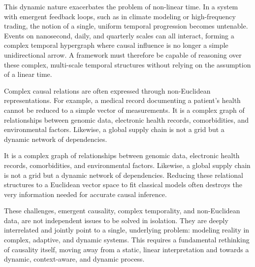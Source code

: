 This dynamic nature exacerbates the problem of non-linear time. In a system with emergent feedback loops, 
such as in climate modeling or high-frequency trading, the notion of a single, uniform temporal progression becomes untenable. 
Events on nanosecond, daily, and quarterly scales can all interact, forming a complex temporal hypergraph where causal influence is no longer a simple unidirectional arrow. 
A framework must therefore be capable of reasoning over these complex, multi-scale temporal structures without relying on the assumption of a linear time. 

Complex causal relations are often expressed through non-Euclidean representations. 
For example, a medical record documenting a patient's health cannot be reduced to a simple vector of measurements. 
It is a complex graph of relationships between genomic data, electronic health records, comorbidities, and environmental factors. 
Likewise, a global supply chain is not a grid but a dynamic network of dependencies.  

It is a complex graph of relationships between genomic data, electronic health records, comorbidities, and environmental factors. 
Likewise, a global supply chain is not a grid but a dynamic network of dependencies. 
Reducing these relational structures to a Euclidean vector space to fit classical models often destroys the very information needed for accurate causal inference. 

These challenges, emergent causality, complex temporality, and non-Euclidean data, are not independent issues to be solved in isolation. 
They are deeply interrelated and jointly point to a single, underlying problem: modeling reality in complex, adaptive, and dynamic systems. 
This requires a fundamental rethinking of causality itself, moving away from a static, linear interpretation and towards a dynamic, context-aware, and dynamic process.

\newpage

 